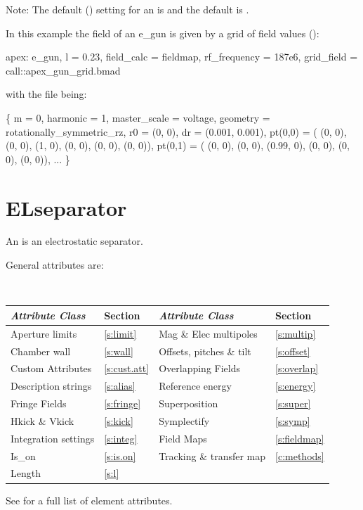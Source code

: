 Note: The default  () setting for an
 is  and the default
 is .

In this example the field of an e_gun is given by a grid of field
values ():
\begin{example}
  apex: e_gun, l = 0.23, field_calc = fieldmap, rf_frequency = 187e6, 
                grid_field = call::apex_gun_grid.bmad
\end{example}
with the file  being:
\begin{example}
  \{
    m = 0, harmonic = 1,
    master_scale = voltage,
    geometry = rotationally_symmetric_rz,
    r0 = (0, 0),
    dr = (0.001, 0.001),
    pt(0,0) = ( (0, 0), (0, 0), (1, 0),  (0, 0), (0, 0), (0, 0)),
    pt(0,1) = ( (0, 0), (0, 0), (0.99, 0),  (0, 0), (0, 0), (0, 0)),
    ... \}
\end{example}

\section{ELseparator}
\label{s:elsep}

An  is an electrostatic separator.

General  attributes are:
\begin{center}
\tt
\begin{tabular}{llll} \toprule
  {\sl Attribute Class}      & Section           & {\sl Attribute Class}      & Section          \\ \midrule
  Aperture limits            & \ref{s:limit}     & Mag \& Elec multipoles     & \ref{s:multip}   \\
  Chamber wall               & \ref{s:wall}      & Offsets, pitches \& tilt   & \ref{s:offset}   \\
  Custom Attributes          & \ref{s:cust.att}  & Overlapping Fields         & \ref{s:overlap}  \\
  Description strings        & \ref{s:alias}     & Reference energy           & \ref{s:energy}   \\ 
  Fringe Fields              & \ref{s:fringe}    & Superposition              & \ref{s:super}    \\
  Hkick \& Vkick             & \ref{s:kick}      & Symplectify                & \ref{s:symp}     \\
  Integration settings       & \ref{s:integ}     & Field Maps                 & \ref{s:fieldmap} \\  
  Is_on                      & \ref{s:is.on}     & Tracking \& transfer map   & \ref{c:methods}  \\ 
  Length                     & \ref{s:l}         &                            &                  \\
  \bottomrule
\end{tabular}
\end{center}
\toffset
See  for a full list of element attributes.

